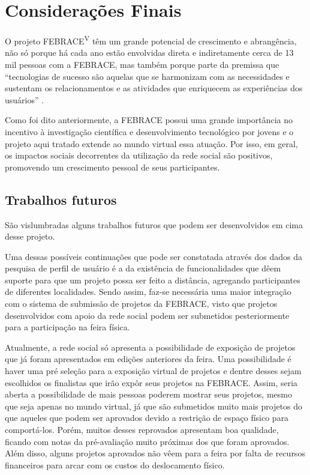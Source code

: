 
\chapter{Considerações Finais}

O projeto FEBRACE\textsuperscript{V} têm um grande potencial de crescimento e abrangência, não só porque há cada ano estão envolvidas direta e indiretamente cerca de 13 mil pessoas com a FEBRACE, mas também porque parte da premissa que “tecnologias de sucesso são aquelas que se harmonizam com as necessidades e sustentam os relacionamentos e as atividades que enriquecem as experiências dos usuários” \cite{shneiderman06}.

Como foi dito anteriormente, a FEBRACE possui uma grande importância no incentivo à investigação científica e desenvolvimento tecnológico por jovens e o projeto aqui tratado extende ao mundo virtual essa atuação. Por isso, em geral, os impactos sociais decorrentes da utilização da rede social são positivos, promovendo um crescimento pessoal de seus participantes.

\section{Trabalhos futuros}

São vislumbradas alguns trabalhos futuros que podem ser desenvolvidos em cima desse projeto. 

Uma dessas possíveis continuações que pode ser constatada através dos dados da pesquisa de perfil de usuário é a da existência de funcionalidades que dêem suporte para que um projeto possa ser feito a distância, agregando participantes de diferentes localidades. Sendo assim, faz-se necessária uma maior integração com o sistema de submissão de projetos da FEBRACE, visto que projetos desenvolvidos com apoio da rede social podem ser submetidos pesteriormente para a participação na feira física. 

Atualmente, a rede social só apresenta a possibilidade de exposição de projetos que já foram apresentados em edições anteriores da feira. Uma possibilidade é haver uma pré seleção para a exposição virtual de projetos e dentre desses sejam escolhidos os finalistas que irão expôr seus projetos na FEBRACE. Assim, seria aberta a possibilidade de mais pessoas poderem mostrar seus projetos, mesmo que seja apenas no mundo virtual, já que são submetidos muito mais projetos do que aqueles que podem ser aprovados devido a restrição de espaço físico para comportá-los. Porém, muitos desses reprovados apresentam boa qualidade, ficando com notas da pré-avaliação muito próximas dos que foram aprovados. Além disso, alguns projetos aprovados não vêem para a feira por falta de recursos financeiros para arcar com os custos do deslocamento físico.

